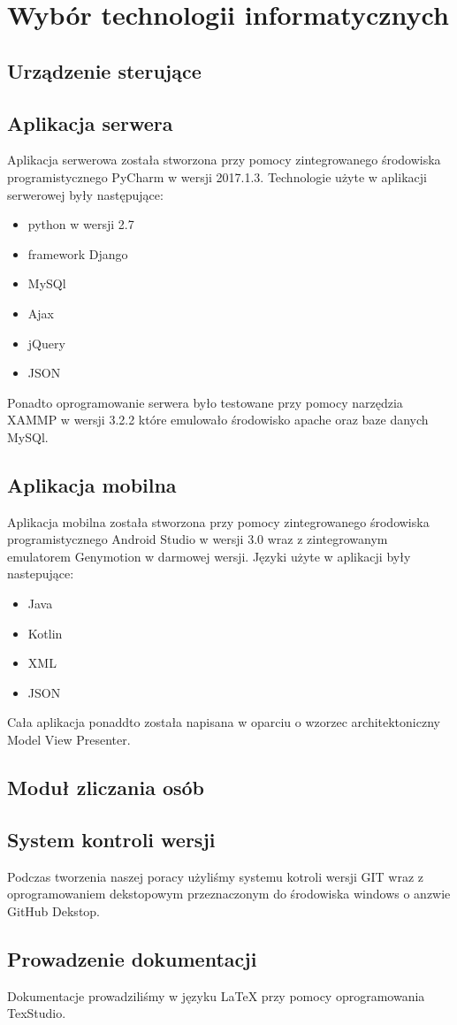 \newpage\section{Wybór technologii informatycznych} \label{sec:technologie}
\subsection{Urządzenie sterujące}

\subsection{Aplikacja serwera}
Aplikacja serwerowa została stworzona przy pomocy zintegrowanego środowiska programistycznego PyCharm w wersji 2017.1.3. Technologie użyte w aplikacji serwerowej były następujące:
\begin{itemize}
	\item python w wersji 2.7
	\item framework Django
	\item MySQl 
	\item Ajax
	\item jQuery
	\item JSON
\end{itemize}
Ponadto oprogramowanie serwera było testowane przy pomocy narzędzia XAMMP w wersji 3.2.2 które emulowało środowisko apache oraz baze danych MySQl.
\subsection{Aplikacja mobilna}
Aplikacja mobilna została stworzona przy pomocy zintegrowanego środowiska programistycznego Android Studio w wersji 3.0 wraz z zintegrowanym emulatorem Genymotion w darmowej wersji. Języki użyte w aplikacji były nastepujące:
\begin{itemize}
	\item Java 
	\item Kotlin
	\item XML
	\item JSON
\end{itemize}
Cała aplikacja ponaddto została napisana w oparciu o wzorzec architektoniczny Model View Presenter. 
\subsection{Moduł zliczania osób}
\subsection{System kontroli wersji}
Podczas tworzenia naszej poracy użyliśmy systemu kotroli wersji GIT wraz z  oprogramowaniem dekstopowym przeznaczonym do środowiska windows o anzwie GitHub Dekstop.
\subsection{Prowadzenie dokumentacji}
 Dokumentacje prowadziliśmy w języku LaTeX przy pomocy oprogramowania TexStudio. 
